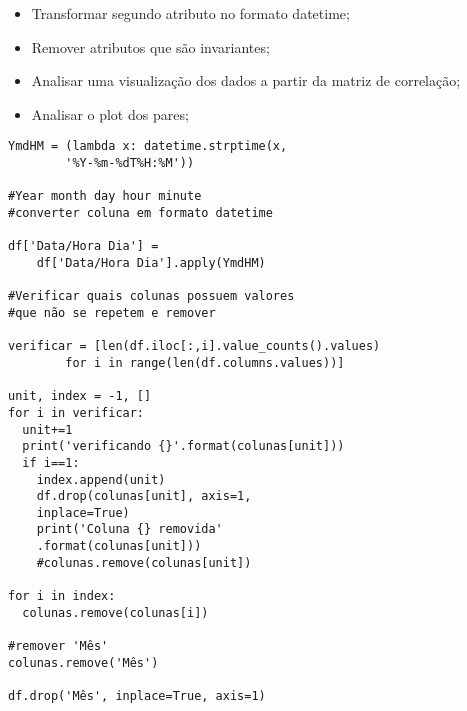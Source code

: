 \documentclass[compress]{beamer}
\begin{document}
\begin{frame}{}
    \begin{itemize}
        \item Transformar segundo atributo no formato datetime;
        \item Remover atributos que são invariantes;
        \item Analisar uma visualização dos dados a partir da matriz de correlação;
        \item Analisar o plot dos pares;
    \end{itemize}
\end{frame}

\begin{verbatim}
YmdHM = (lambda x: datetime.strptime(x,
        '%Y-%m-%dT%H:%M'))

#Year month day hour minute
#converter coluna em formato datetime

df['Data/Hora Dia'] =
    df['Data/Hora Dia'].apply(YmdHM)

#Verificar quais colunas possuem valores
#que não se repetem e remover

verificar = [len(df.iloc[:,i].value_counts().values)
        for i in range(len(df.columns.values))]

unit, index = -1, []
for i in verificar: 
  unit+=1 
  print('verificando {}'.format(colunas[unit]))
  if i==1:
    index.append(unit)
    df.drop(colunas[unit], axis=1,
    inplace=True)
    print('Coluna {} removida'
    .format(colunas[unit]))
    #colunas.remove(colunas[unit])

for i in index:
  colunas.remove(colunas[i])

#remover 'Mês'
colunas.remove('Mês')

df.drop('Mês', inplace=True, axis=1)
\end{verbatim}
\end{document}
